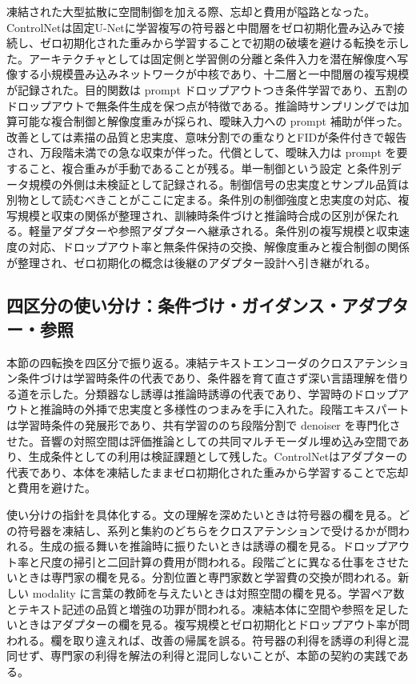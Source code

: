 \documentclass[lualatex,a4paper,10pt]{jlreq}
\begin{document}
凍結された大型拡散に空間制御を加える際、忘却と費用が隘路となった。ControlNetは固定U-Netに学習複写の符号器と中間層をゼロ初期化畳み込みで接続し、ゼロ初期化された重みから学習することで初期の破壊を避ける転換を示した\autocite{btd036}。アーキテクチャとしては固定側と学習側の分離と条件入力を潜在解像度へ写像する小規模畳み込みネットワークが中核であり、十二層と一中間層の複写規模が記録された\autocite{btd036}。目的関数は prompt ドロップアウトつき条件学習であり、五割のドロップアウトで無条件生成を保つ点が特徴である\autocite{btd036}。推論時サンプリングでは加算可能な複合制御と解像度重みが採られ、曖昧入力への prompt 補助が伴った\autocite{btd036}。改善としては素描の品質と忠実度、意味分割での重なりとFIDが条件付きで報告され、万段階未満での急な収束が伴った\autocite{btd036}。代償として、曖昧入力は prompt を要すること、複合重みが手動であることが残る\autocite{btd036}。単一制御という設定 と条件別データ規模の外側は未検証として記録される。制御信号の忠実度とサンプル品質は別物として読むべきことがここに定まる。条件別の制御強度と忠実度の対応、複写規模と収束の関係が整理され、訓練時条件づけと推論時合成の区別が保たれる。軽量アダプターや参照アダプターへ継承される。条件別の複写規模と収束速度の対応、ドロップアウト率と無条件保持の交換、解像度重みと複合制御の関係が整理され、ゼロ初期化の概念は後継のアダプター設計へ引き継がれる\autocite{btd036}。

\subsection{四区分の使い分け：条件づけ・ガイダンス・アダプター・参照}
本節の四転換を四区分で振り返る。凍結テキストエンコーダのクロスアテンション条件づけは学習時条件の代表であり、条件器を育て直さず深い言語理解を借りる道を示した\autocite{btd011,btd031}。分類器なし誘導は推論時誘導の代表であり、学習時のドロップアウトと推論時の外挿で忠実度と多様性のつまみを手に入れた\autocite{btd032,btd033}。段階エキスパートは学習時条件の発展形であり、共有学習ののち段階分割で denoiser を専門化させた\autocite{btd034}。音響の対照空間は評価推論としての共同マルチモーダル埋め込み空間であり、生成条件としての利用は検証課題として残した\autocite{btd035}。ControlNetはアダプターの代表であり、本体を凍結したままゼロ初期化された重みから学習することで忘却と費用を避けた\autocite{btd036}。

使い分けの指針を具体化する。文の理解を深めたいときは符号器の欄を見る。どの符号器を凍結し、系列と集約のどちらをクロスアテンションで受けるかが問われる\autocite{btd011}。生成の振る舞いを推論時に振りたいときは誘導の欄を見る。ドロップアウト率と尺度の掃引と二回計算の費用が問われる\autocite{btd032}。段階ごとに異なる仕事をさせたいときは専門家の欄を見る。分割位置と専門家数と学習費の交換が問われる\autocite{btd034}。新しい modality に言葉の教師を与えたいときは対照空間の欄を見る。学習ペア数とテキスト記述の品質と増強の功罪が問われる\autocite{btd035}。凍結本体に空間や参照を足したいときはアダプターの欄を見る。複写規模とゼロ初期化とドロップアウト率が問われる\autocite{btd036}。欄を取り違えれば、改善の帰属を誤る。符号器の利得を誘導の利得と混同せず、専門家の利得を解法の利得と混同しないことが、本節の契約の実践である。
\end{document}
